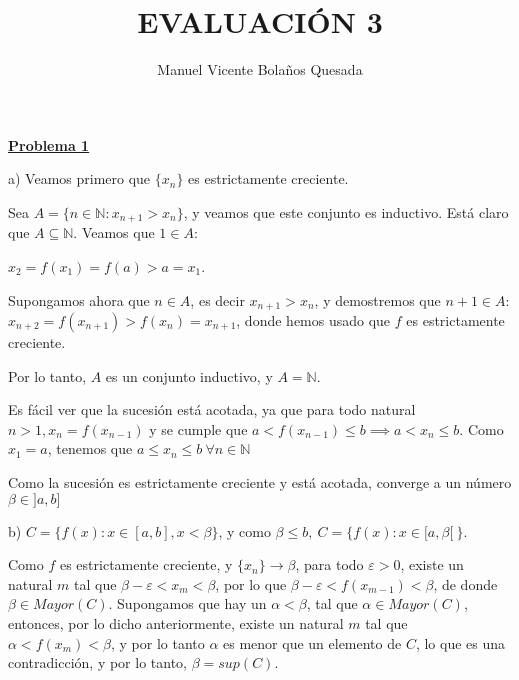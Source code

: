 \documentclass[10pt,a4paper]{article}
\begin{document}
	\title{EVALUACIÓN 3}
	\author{Manuel Vicente Bolaños Quesada}
	\date{}
	\maketitle
	
	
	\begin{flushleft}
		\textbf{\underline{Problema 1}}
	\end{flushleft}
	
	a) Veamos primero que $\{x_n\}$ es estrictamente creciente. \newline
	
	Sea $A = \{ n \in \mathbb{N} : x_{n+1} > x_n\}$, y veamos que este conjunto es inductivo. Está claro que $A \subseteq \mathbb{N}$. Veamos que $1 \in A$:
	
	$x_2 = f(x_1) = f(a) > a = x_1$. \newline
	
	Supongamos ahora que $n \in A$, es decir $x_{n+1} > x_n$, y demostremos que $n+1 \in A$: \\
	$x_{n+2} = f(x_{n+1}) > f(x_n) = x_{n+1}$, donde hemos usado que $f$ es estrictamente creciente.
	
	Por lo tanto, $A$ es un conjunto inductivo, y $A = \mathbb{N}$. \newline
	
	Es fácil ver que la sucesión está acotada, ya que para todo natural $n > 1, x_n = f(x_{n-1})$ y se cumple que $a < f(x_{n-1}) \leq b \implies a < x_n \leq b$. Como $x_1 = a$, tenemos que $a \leq x_n \leq b ~\forall n \in \mathbb{N}$\newline
	
	Como la sucesión es estrictamente creciente y está acotada, converge a un número $\beta \in ]a, b]$ \newline
	
	b) $C = \{f(x): x \in [a, b], x < \beta\}$, y como $\beta \leq b, ~ C = \{f(x): x \in [a, \beta[ ~ \}$.
	
	Como $f$ es estrictamente creciente, y $\{x_n\} \rightarrow \beta$, para todo $\varepsilon > 0$, existe un natural $m$ tal que $ \beta - \varepsilon < x_m < \beta$, por lo que $ \beta - \varepsilon < f(x_{m-1}) < \beta$, de donde $\beta \in Mayor(C)$. Supongamos que hay un $\alpha < \beta$, tal que $\alpha \in Mayor(C)$, entonces, por lo dicho anteriormente, existe un natural $m$ tal que $\alpha < f(x_m) < \beta$, y por lo tanto $\alpha$ es menor que un elemento de $C$, lo que es una contradicción, y por lo tanto, $\beta = sup(C)$. \newline
	
\end{document}
